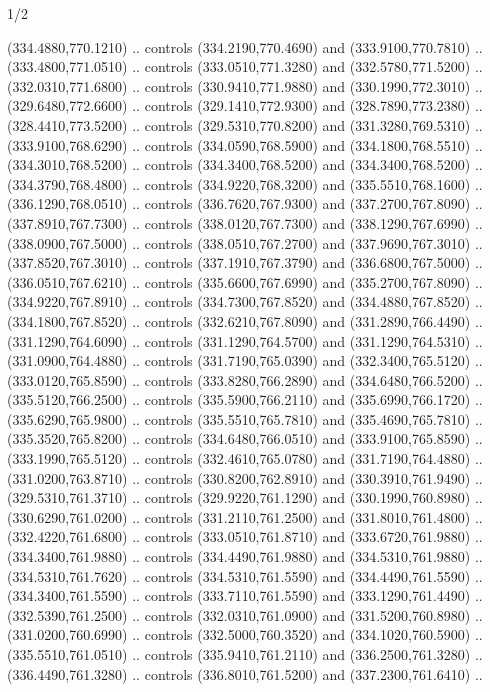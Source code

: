\begin{flagdescription}{1/2}
\begin{scope}[xshift=0.5\flaglength]
\begin{scope}[scale=0.00745\flagwidth,xshift=-12.1mm,yshift=41.7mm]
\begin{scope}[y=0.80pt, x=0.80pt, yscale=-1, xscale=1, inner sep=0pt, outer sep=0pt]
\begin{scope}[cm={{1.33333,0.0,0.0,-1.33333,(0.0,114.66667)}}]
\begin{scope}[scale=0.100]
  (334.4880,770.1210) .. controls (334.2190,770.4690) and (333.9100,770.7810) ..
  (333.4800,771.0510) .. controls (333.0510,771.3280) and (332.5780,771.5200) ..
  (332.0310,771.6800) .. controls (330.9410,771.9880) and (330.1990,772.3010) ..
  (329.6480,772.6600) .. controls (329.1410,772.9300) and (328.7890,773.2380) ..
  (328.4410,773.5200) .. controls (329.5310,770.8200) and (331.3280,769.5310) ..
  (333.9100,768.6290) .. controls (334.0590,768.5900) and (334.1800,768.5510) ..
  (334.3010,768.5200) .. controls (334.3400,768.5200) and (334.3400,768.5200) ..
  (334.3790,768.4800) .. controls (334.9220,768.3200) and (335.5510,768.1600) ..
  (336.1290,768.0510) .. controls (336.7620,767.9300) and (337.2700,767.8090) ..
  (337.8910,767.7300) .. controls (338.0120,767.7300) and (338.1290,767.6990) ..
  (338.0900,767.5000) .. controls (338.0510,767.2700) and (337.9690,767.3010) ..
  (337.8520,767.3010) .. controls (337.1910,767.3790) and (336.6800,767.5000) ..
  (336.0510,767.6210) .. controls (335.6600,767.6990) and (335.2700,767.8090) ..
  (334.9220,767.8910) .. controls (334.7300,767.8520) and (334.4880,767.8520) ..
  (334.1800,767.8520) .. controls (332.6210,767.8090) and (331.2890,766.4490) ..
  (331.1290,764.6090) .. controls (331.1290,764.5700) and (331.1290,764.5310) ..
  (331.0900,764.4880) .. controls (331.7190,765.0390) and (332.3400,765.5120) ..
  (333.0120,765.8590) .. controls (333.8280,766.2890) and (334.6480,766.5200) ..
  (335.5120,766.2500) .. controls (335.5900,766.2110) and (335.6990,766.1720) ..
  (335.6290,765.9800) .. controls (335.5510,765.7810) and (335.4690,765.7810) ..
  (335.3520,765.8200) .. controls (334.6480,766.0510) and (333.9100,765.8590) ..
  (333.1990,765.5120) .. controls (332.4610,765.0780) and (331.7190,764.4880) ..
  (331.0200,763.8710) .. controls (330.8200,762.8910) and (330.3910,761.9490) ..
  (329.5310,761.3710) .. controls (329.9220,761.1290) and (330.1990,760.8980) ..
  (330.6290,761.0200) .. controls (331.2110,761.2500) and (331.8010,761.4800) ..
  (332.4220,761.6800) .. controls (333.0510,761.8710) and (333.6720,761.9880) ..
  (334.3400,761.9880) .. controls (334.4490,761.9880) and (334.5310,761.9880) ..
  (334.5310,761.7620) .. controls (334.5310,761.5590) and (334.4490,761.5590) ..
  (334.3400,761.5590) .. controls (333.7110,761.5590) and (333.1290,761.4490) ..
  (332.5390,761.2500) .. controls (332.0310,761.0900) and (331.5200,760.8980) ..
  (331.0200,760.6990) .. controls (332.5000,760.3520) and (334.1020,760.5900) ..
  (335.5510,761.0510) .. controls (335.9410,761.2110) and (336.2500,761.3280) ..
  (336.4490,761.3280) .. controls (336.8010,761.5200) and (337.2300,761.6410) ..

\end{scope}
\end{scope}
\end{scope}
\end{scope}
\end{scope}
\end{flagdescription}
